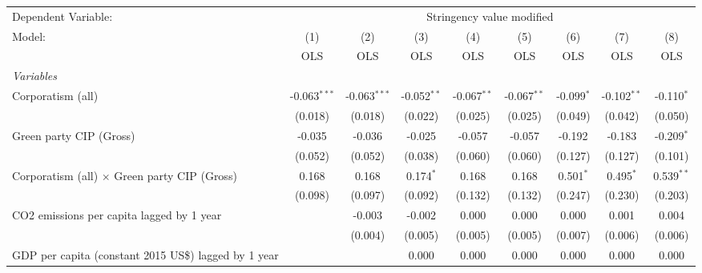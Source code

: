 
\begingroup
\centering
\begin{tabular}{lcccccccc}
   \toprule
   Dependent Variable: & \multicolumn{8}{c}{Stringency value modified}\\
   Model:                                                    & (1)            & (2)            & (3)           & (4)           & (5)           & (6)          & (7)           & (8)\\  
                                                             &  OLS           & OLS            & OLS           & OLS           & OLS           & OLS          & OLS           & OLS\\  
   \midrule
   \emph{Variables}\\
   Corporatism (all)                                         & -0.063$^{***}$ & -0.063$^{***}$ & -0.052$^{**}$ & -0.067$^{**}$ & -0.067$^{**}$ & -0.099$^{*}$ & -0.102$^{**}$ & -0.110$^{*}$\\   
                                                             & (0.018)        & (0.018)        & (0.022)       & (0.025)       & (0.025)       & (0.049)      & (0.042)       & (0.050)\\   
   Green party CIP (Gross)                                   & -0.035         & -0.036         & -0.025        & -0.057        & -0.057        & -0.192       & -0.183        & -0.209$^{*}$\\   
                                                             & (0.052)        & (0.052)        & (0.038)       & (0.060)       & (0.060)       & (0.127)      & (0.127)       & (0.101)\\   
   Corporatism (all) $\times$ Green party CIP (Gross)        & 0.168          & 0.168          & 0.174$^{*}$   & 0.168         & 0.168         & 0.501$^{*}$  & 0.495$^{*}$   & 0.539$^{**}$\\   
                                                             & (0.098)        & (0.097)        & (0.092)       & (0.132)       & (0.132)       & (0.247)      & (0.230)       & (0.203)\\   
   CO2 emissions per capita lagged by 1 year                 &                & -0.003         & -0.002        & 0.000         & 0.000         & 0.000        & 0.001         & 0.004\\   
                                                             &                & (0.004)        & (0.005)       & (0.005)       & (0.005)       & (0.007)      & (0.006)       & (0.006)\\   
   GDP per capita (constant 2015 US\$) lagged by 1 year      &                &                & 0.000         & 0.000         & 0.000         & 0.000        & 0.000         & 0.000\\   

\end{tabular}
